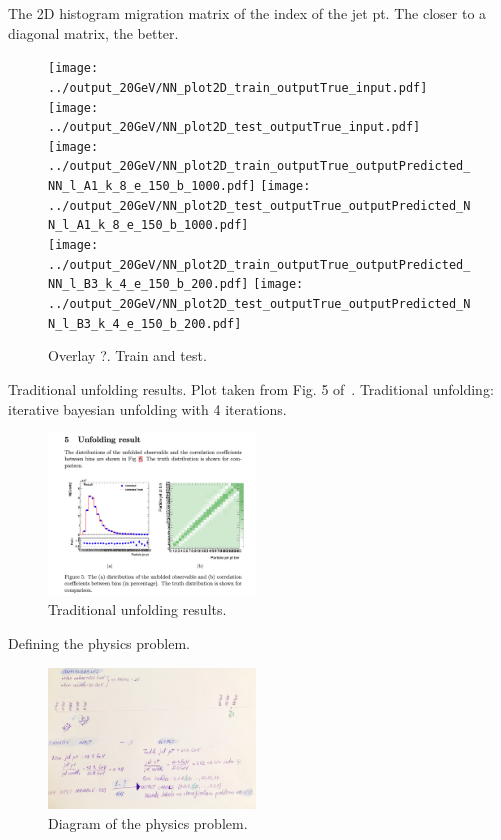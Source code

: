 The 2D histogram migration matrix of the index of the jet pt. The closer to a diagonal matrix, the better.

\begin{figure}[h]
  \centering
  \texttt{[image: ../output\_20GeV/NN\_plot2D\_train\_outputTrue\_input.pdf]}
  \texttt{[image: ../output\_20GeV/NN\_plot2D\_test\_outputTrue\_input.pdf]}\\
  \texttt{[image: ../output\_20GeV/NN\_plot2D\_train\_outputTrue\_outputPredicted\_NN\_l\_A1\_k\_8\_e\_150\_b\_1000.pdf]}
  \texttt{[image: ../output\_20GeV/NN\_plot2D\_test\_outputTrue\_outputPredicted\_NN\_l\_A1\_k\_8\_e\_150\_b\_1000.pdf]}\\
  \texttt{[image: ../output\_20GeV/NN\_plot2D\_train\_outputTrue\_outputPredicted\_NN\_l\_B3\_k\_4\_e\_150\_b\_200.pdf]}
  \texttt{[image: ../output\_20GeV/NN\_plot2D\_test\_outputTrue\_outputPredicted\_NN\_l\_B3\_k\_4\_e\_150\_b\_200.pdf]}\\
  \caption{Overlay ?. Train and test.}
  \label{fig:2DMigrationMatrix}
\end{figure}

Traditional unfolding results. Plot taken from Fig. 5 of~\cite{ReportYichenLi}. Traditional unfolding: iterative bayesian unfolding with 4 iterations. 

\begin{figure}[h]
  \centering
  \includegraphics[width=0.49\textwidth]{../presentation/plots/TraditionalUnfolding.png}
  \caption{Traditional unfolding results.}
  \label{fig:2DMigrationMatrix}
\end{figure}

Defining the physics problem. 

\begin{figure}[h]
  \centering
  \includegraphics[width=0.49\textwidth]{../presentation/plots/PhysicsProblem.jpg}
  \caption{Diagram of the physics problem.}
  \label{fig:PhysicsProblem}
\end{figure}

